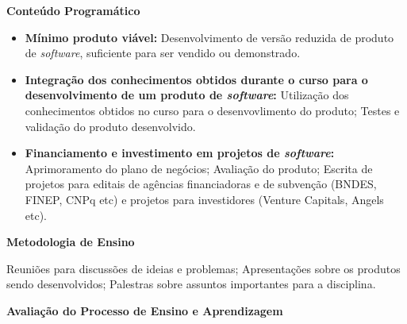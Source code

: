 
\begin{snugshade}\begin{center}\textbf{
    Conteúdo Programático
}\end{center}\end{snugshade}

\begin{itemize}

 \item \textbf{M\'inimo produto vi\'avel:} Desenvolvimento de vers\~ao reduzida de produto de \textit{software}, suficiente para ser vendido ou demonstrado.


 \item \textbf{Integra\c{c}\~ao dos conhecimentos obtidos durante o curso para o desenvolvimento de um produto de \textit{software}:} Utiliza\c{c}\~ao dos conhecimentos obtidos no curso para o desenvovlimento do produto; Testes e valida\c{c}\~ao do produto desenvolvido.

 \item \textbf{Financiamento e investimento em projetos de \textit{software}:} Aprimoramento do plano de neg\'ocios; Avalia\c{c}\~ao do produto; Escrita de projetos para editais de agências financiadoras e de subvenção (BNDES, FINEP, CNPq etc) e projetos para investidores (Venture Capitals, Angels etc).


\end{itemize}


\begin{snugshade}\begin{center}\textbf{
    Metodologia de Ensino
}\end{center}\end{snugshade}

\noindent
Reuni\~oes para discuss\~oes de ideias e problemas; Apresenta\c{c}\~oes sobre os produtos sendo desenvolvidos; Palestras sobre assuntos importantes para a disciplina.

\begin{snugshade}\begin{center}\textbf{
    Avaliação do Processo de Ensino e Aprendizagem
}\end{center}\end{snugshade}

